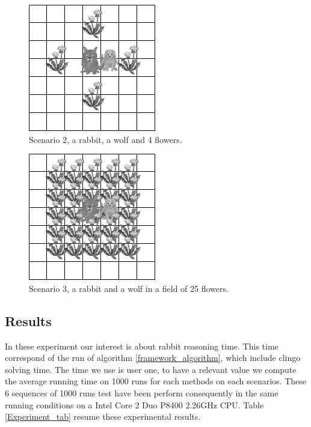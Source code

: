 \documentclass{aamas2012}
\begin{document}
	\begin{figure}
		\centering
		\includegraphics[keepaspectratio=true, scale=0.5]{scenario_2.png}
		\caption
		{
			\label{scenario_2}
			Scenario 2, a rabbit, a wolf and 4 flowers.
		}
	\end{figure}
	
	\begin{figure}
		\centering
		\includegraphics[keepaspectratio=true, scale=0.5]{scenario_3.png}
		\caption
		{
			\label{scenario_3}
			Scenario 3, a rabbit and a wolf in a field of 25 flowers.
		}
	\end{figure}
	
\subsection{Results}

	In these experiment our interest is about rabbit reasoning time.
	This time correspond of the run of algorithm \ref{framework_algorithm}, which include clingo solving time.
	The time we use is user one, to have a relevant value we compute the average running time on 1000 runs for each methods on each scenarios.
	These 6 sequences of 1000 runs test have been perform consequently in the same running conditions on a Intel Core 2 Duo P8400 2.26GHz CPU.
	Table \ref{Experiment_tab} resume these experimental results.
	
\end{document}
